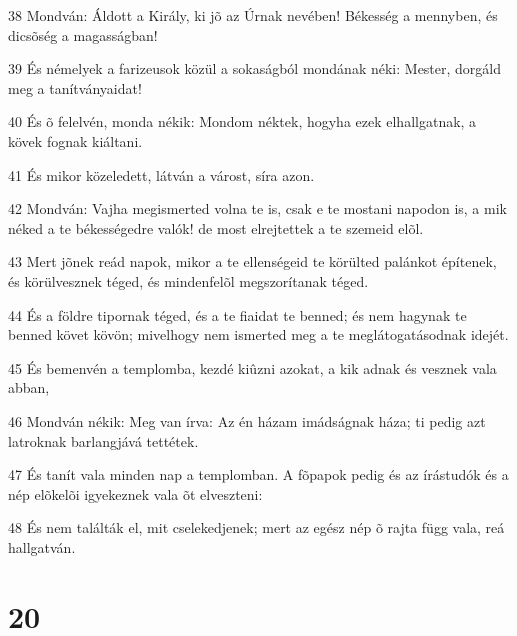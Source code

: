 \par 38 Mondván: Áldott a Király, ki jõ az Úrnak nevében! Békesség a mennyben, és dicsõség a magasságban!
\par 39 És némelyek a farizeusok közül a sokaságból mondának néki: Mester, dorgáld meg a tanítványaidat!
\par 40 És õ felelvén, monda nékik: Mondom néktek, hogyha ezek elhallgatnak, a kövek fognak kiáltani.
\par 41 És mikor közeledett, látván a várost, síra azon.
\par 42 Mondván: Vajha megismerted volna te is, csak e te mostani napodon is, a mik néked a te békességedre valók! de most elrejtettek a te szemeid elõl.
\par 43 Mert jõnek reád napok, mikor a te ellenségeid te körülted palánkot építenek, és körülvesznek téged, és mindenfelõl megszorítanak téged.
\par 44 És a földre tipornak téged, és a te fiaidat te benned; és nem hagynak te benned követ kövön; mivelhogy nem ismerted meg a te  meglátogatásodnak idejét.
\par 45 És bemenvén a templomba, kezdé kiûzni azokat, a kik adnak és vesznek vala abban,
\par 46 Mondván nékik: Meg van írva: Az én házam imádságnak háza; ti pedig azt latroknak barlangjává tettétek.
\par 47 És tanít vala minden nap a templomban. A fõpapok pedig és az írástudók és a nép elõkelõi igyekeznek vala õt elveszteni:
\par 48 És nem találták el, mit cselekedjenek; mert az egész nép õ rajta függ vala, reá hallgatván.

\chapter{20}

